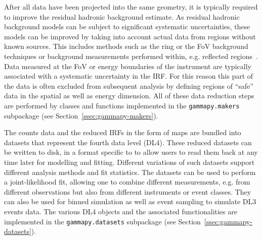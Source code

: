 \documentclass[longauth]{aa}
\newcommand{\code}[1]{\texttt{#1}}
\begin{document}
After all data have been projected into the same geometry, it is typically
required to improve the residual hadronic background estimate. As residual hadronic
background models can be subject to significant systematic uncertainties,
these models can be improved by taking into account actual data
from regions without known \gammaray sources. This includes methods 
such as the ring or the FoV background techniques or
background measurements performed within, e.g. reflected regions~\citep{Berge07}.
Data measured at the FoV or energy boundaries of the instrument are typically
associated with a systematic uncertainty in the IRF. For this reason this part 
of the data is often excluded from subsequent analysis by defining regions of
 \enquote{safe} data in the spatial as well as energy dimension.
All of these data reduction steps are performed by classes and functions
implemented in the \code{gammapy.makers} subpackage (see Section~\ref{ssec:gammapy-makers}).

The counts data and the reduced IRFs in the form of maps are bundled into datasets
that represent the fourth data level (DL4). These reduced datasets can be written to disk,
in a format specific to \gammapy to allow users to read them back at any time later
for modelling and fitting. Different variations of such datasets support different 
analysis methods and fit statistics. The datasets can be used to perform a joint-likelihood
fit, allowing one to combine different measurements, e.g. from different observations
but also from different instruments or event classes. They can also be used for binned
simulation as well as event sampling to simulate DL3 events data.
The various DL4 objects and the associated functionalities are
implemented in the \code{gammapy.datasets} subpackage (see Section~\ref{ssec:gammapy-datasets}).
\end{document}
